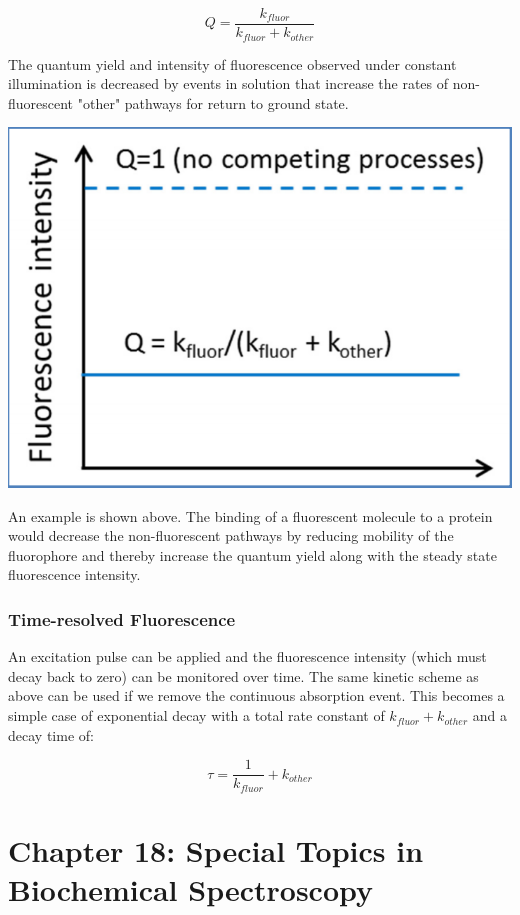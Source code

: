 \documentclass[12pt, letterpaper]{article}
\begin{document}
 \begin{equation*}
    Q = \frac{k_{fluor}}{k_{fluor} + k_{other}}
 \end{equation*}

 The quantum yield and intensity of fluorescence observed under constant illumination is decreased by events in solution that increase the rates of non-fluorescent "other" pathways
 for return to ground state. 

 \begin{center}
    \includegraphics{quantum.png}
 \end{center}

 An example is shown above. The binding of a fluorescent molecule to a protein would decrease the non-fluorescent pathways by reducing mobility of the fluorophore and thereby increase the 
 quantum yield along with the steady state fluorescence intensity. 

 \subsubsection*{Time-resolved Fluorescence}
 An excitation pulse can be applied and the fluorescence intensity (which must decay back to zero) can be monitored over time. The same kinetic scheme as above can be used if 
 we remove the continuous absorption event. This becomes a simple case of exponential decay with a total rate constant of $k_{fluor} + k_{other}$ and a decay time of: 

 \begin{equation*}
    \tau = \frac{1}{k_{fluor}}+ k_{other}
 \end{equation*}

\newpage

\section*{Chapter 18: Special Topics in Biochemical Spectroscopy}
\end{document}
